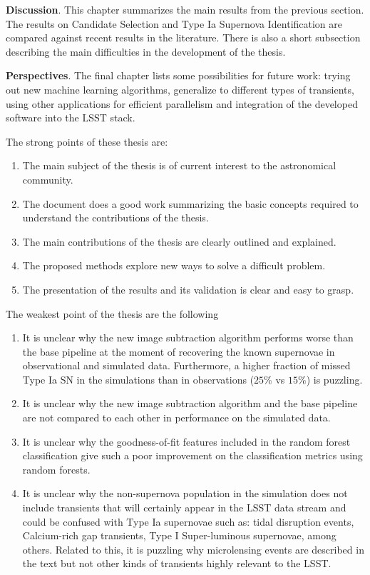 \documentclass{article}
\begin{document}
\vspace{1cm}
{\bf Discussion}. This chapter summarizes the main results from the previous section.
The results on Candidate Selection and Type Ia Supernova Identification are compared
against recent results in the literature. There is also a short subsection describing
the main difficulties in the development of the thesis.

\vspace{1cm}

{\bf Perspectives}. The final chapter lists some possibilities for future work:
trying out new machine learning algorithms, generalize to different types of
transients, using other applications for efficient parallelism and integration of the
developed software into the LSST stack.

The strong points of these thesis are:
\begin{enumerate}
    \item The main subject of the thesis is of current interest to the astronomical
    community.
    \item The document does a good work summarizing the basic concepts required to
    understand the contributions of the thesis.
    \item The main contributions of the thesis are clearly outlined and explained.
    \item The proposed methods explore new ways to solve a difficult problem.
    \item The presentation of the results and its validation is clear and easy to
    grasp.
\end{enumerate}

The weakest point of the thesis are the following
\begin{enumerate}
    \item It is unclear why the new image subtraction algorithm performs worse than the base pipeline at the moment of recovering the known supernovae in observational and simulated data. Furthermore, a higher fraction of missed Type Ia SN in the simulations than in observations ($25\%$ vs $15\%$) is puzzling.
    \item It is unclear why the new image subtraction algorithm and the base pipeline are not compared to each other in performance on the simulated data.
    \item It is unclear why the goodness-of-fit features included in the random forest classification give such a poor improvement on the classification metrics using random forests. 
    \item It is unclear why the non-supernova population in the simulation does not include transients that will certainly appear in the LSST data stream and could be confused with Type Ia supernovae such as: tidal disruption events, Calcium-rich gap transients, Type I Super-luminous supernovae, among others. Related to this, it is puzzling why microlensing events are described in the text but not other kinds of transients highly relevant to the LSST.
\end{enumerate}
\end{document}
